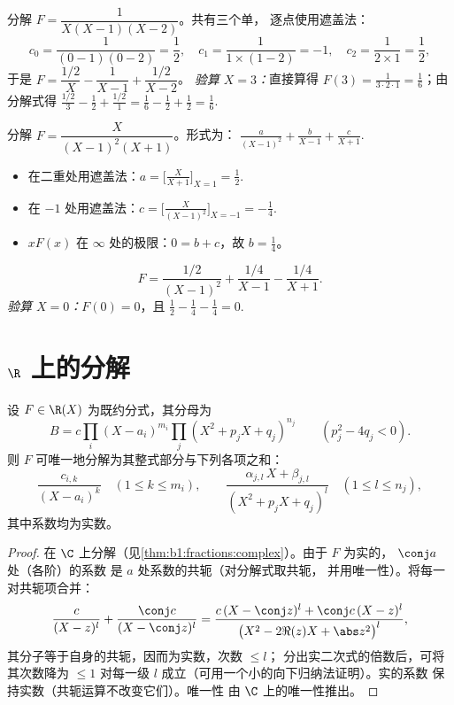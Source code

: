 \begin{example}\label{ex:b1:fractions:simple}
分解 $F = \dfrac{1}{X(X-1)(X-2)}$。共有三个单，
逐点使用遮盖法：
\[
c_0 = \frac{1}{(0-1)(0-2)} = \frac12,
\quad
c_1 = \frac{1}{1 \times (1 - 2)} = -1,
\quad
c_2 = \frac{1}{2 \times 1} = \frac12,
\]
于是 $F = \dfrac{1/2}{X} - \dfrac{1}{X-1} + \dfrac{1/2}{X-2}$。
\emph{验算 $X = 3$：}直接算得 $F(3) = \frac{1}{3\cdot2\cdot1} =
\frac16$；由分解式得 $\frac{1/2}{3} - \frac{1}{2} +
\frac{1/2}{1} = \frac16 - \frac12 + \frac12 = \frac16$.
\end{example}

\begin{example}[重极点]\label{ex:b1:fractions:multiple}
分解 $F = \dfrac{X}{(X-1)^2 (X+1)}$。形式为：
$\frac{a}{(X-1)^2} + \frac{b}{X-1} + \frac{c}{X+1}$.
\begin{itemize}
  \item 在二重处用遮盖法：$a = \bigl[\frac{X}{X+1}\bigr]_{X=1}
        = \frac12$.
  \item 在 $-1$ 处用遮盖法：$c = \bigl[\frac{X}{(X-1)^2}\bigr]_{X=-1} =
        -\frac14$.
  \item $xF(x)$ 在 $\infty$ 处的极限：$0 = b + c$，故 $b = \frac14$。
\end{itemize}
\[
F = \frac{1/2}{(X-1)^2} + \frac{1/4}{X-1} - \frac{1/4}{X+1} .
\]
\emph{验算 $X = 0$：}$F(0) = 0$，且 $\frac12 - \frac14 - \frac14
= 0$.
\end{example}

\section{$\R$ 上的分解}

\begin{theorem}[$\R$ 上的分解]\label{thm:b1:fractions:real}
设 $F \in \R(X)$ 为既约分式，其分母为
\[
B = c \prod_i (X - a_i)^{m_i} \prod_j (X^2 + p_j X + q_j)^{n_j}
\qquad (p_j^2 - 4q_j < 0).
\]
则 $F$ 可唯一地分解为其整式部分与下列各项之和：
\[
\frac{c_{i,k}}{(X - a_i)^k} \quad (1 \leq k \leq m_i),
\qquad
\frac{\alpha_{j,l}\, X + \beta_{j,l}}{(X^2 + p_j X + q_j)^{l}}
\quad (1 \leq l \leq n_j),
\]
其中系数均为实数。
\end{theorem}

\begin{proof}
在 $\C$ 上分解（见\cref{thm:b1:fractions:complex}）。由于 $F$
为实的， $\conj a$ 处（各阶）的系数
是 $a$ 处系数的共轭（对分解式取共轭，
并用唯一性）。将每一对共轭项合并：
\[
\frac{c}{(X - z)^l} + \frac{\conj c}{(X - \conj z)^l}
= \frac{c\,(X - \conj z)^l + \conj c\,(X - z)^l}{\bigl(X^2 - 2\Re(z)X
+ \abs z^2\bigr)^{l}},
\]
其分子等于自身的共轭，因而为实数，次数 $\leq l$；
分出实二次式的倍数后，可将其次数降为
$\leq 1$ 对每一级 $l$ 成立（可用一个小的向下归纳法证明）。实的系数
保持实数（共轭运算不改变它们）。唯一性
由 $\C$ 上的唯一性推出。
\end{proof}

